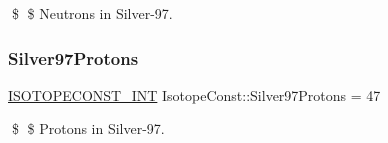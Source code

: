 \$ \$ Neutrons in Silver-\/97. \mbox{\label{group___isotope_const-_silver-_ag97_ga236c842b71eb5df2209fead4f5dd38bc}} 
\subsubsection{\texorpdfstring{Silver97\+Protons}{Silver97Protons}}
{\footnotesize\ttfamily \mbox{\hyperlink{group___isotope_const-_macros_ga5f18360b3e99483a35c32d789e62621c}{I\+S\+O\+T\+O\+P\+E\+C\+O\+N\+S\+T\+\_\+\+I\+NT}} Isotope\+Const\+::\+Silver97\+Protons = 47}

\$ \$ Protons in Silver-\/97. 